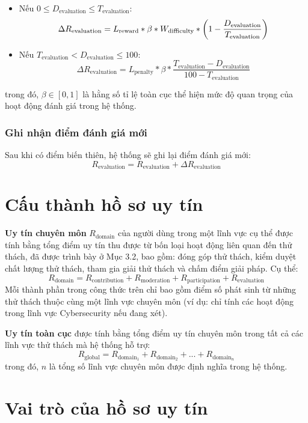 \begin{itemize}
  \item Nếu $0 \leq D_{\text{evaluation}} \leq  T_{\text{evaluation}}$:
        \[\Delta R_{\text{\text{evaluation}}} = L_{\text{reward}}*\beta*W_{\text{difficulty}} * \left(1 - \frac{D_{\text{evaluation}}}{T_{\text{evaluation}}}\right) \]
  \item Nếu $T_{\text{evaluation}} < D_{\text{evaluation}} \leq 100$:
        \[\Delta R_{{\text{evaluation}}} = L_{\text{penalty}}*\beta * \frac{T_{\text{evaluation}} - D_{\text{evaluation}}}{100-T_{\text{evaluation}}} \]
\end{itemize}
trong đó, $\beta \in [0, 1]$ là hằng số tỉ lệ toàn cục thể hiện mức độ quan trọng của hoạt động đánh giá trong hệ thống.

\subsubsection{Ghi nhận điểm đánh giá mới}

Sau khi có điểm biến thiên, hệ thống sẽ ghi lại điểm đánh giá mới:
\[R_{\text{evaluation}} = R_{\text{evaluation}} + \Delta R_{\text{evaluation}}\]

\section{Cấu thành hồ sơ uy tín}

\textbf{Uy tín chuyên môn} $R_{\text{domain}}$ của người dùng trong một lĩnh vực cụ thể được tính bằng tổng điểm uy tín thu được từ bốn loại hoạt động liên quan đến thử thách,
đã được trình bày ở Mục 3.2, bao gồm: đóng góp thử thách, kiểm duyệt chất lượng thử thách, tham gia giải thử thách và chấm điểm giải pháp. Cụ thể:
\[R_{\text{domain}} = R_{\text{contribution}} + R_{\text{moderation}} + R_{\text{participation}} + R_{\text{evaluation}} \]
Mỗi thành phần trong công thức trên chỉ bao gồm điểm số phát sinh từ những thử thách thuộc cùng một lĩnh vực chuyên môn (ví dụ: chỉ tính các hoạt động trong lĩnh vực Cybersecurity nếu đang xét).

\textbf{Uy tín toàn cục} được tính bằng tổng điểm uy tín chuyên môn trong tất cả các lĩnh vực thử thách mà hệ thống hỗ trợ:
\[R_{\text{global}} = R_{\text{domain}_1} + R_{\text{domain}_2} + ... + R_{\text{domain}_n}\]
trong đó, $n$ là tổng số lĩnh vực chuyên môn được định nghĩa trong hệ thống.

\section{Vai trò của hồ sơ uy tín}

